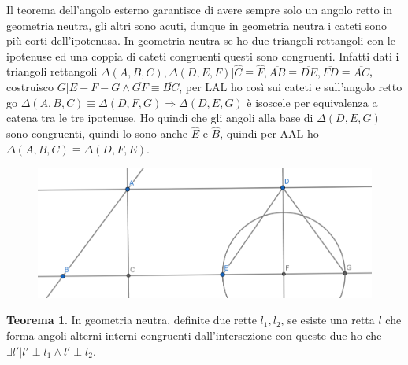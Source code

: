 \documentclass[a4paper,10pt]{article}
\theoremstyle{definition}
\theoremstyle{indentdefinition}
\theoremstyle{indentpostulate}
\theoremstyle{indenttheorem}
\newtheorem{thm}{Teorema}[section]
\theoremstyle{myremark}
\theoremstyle{indentgeneral}
\newenvironment{myboxed} 
{\noindent\begin{lrbox}{\mybox}\begin{minipage}{\textwidth}}
{\end{minipage}\end{lrbox}\fbox{\usebox{\mybox}}}
\begin{document}
Il teorema dell'angolo esterno garantisce di avere sempre solo un angolo retto in geometria neutra, gli altri sono acuti, dunque in geometria  neutra i cateti sono più corti dell'ipotenusa. In geometria neutra se ho due triangoli rettangoli con le ipotenuse ed una coppia di cateti congruenti questi sono congruenti. Infatti dati i triangoli rettangoli $\Delta (A,B,C), \Delta (D,E,F)| \hat{C} \equiv \hat{F}, \overline{AB} \equiv \overline{DE}, \overline{FD} \equiv \overline{AC}$, costruisco $G| E-F-G \land \overline{GF} \equiv \overline{BC}$, per LAL ho così sui cateti e sull'angolo retto go $\Delta (A,B,C) \equiv \Delta (D,F,G) \Rightarrow \Delta (D,E,G)$ è isoscele per equivalenza a catena tra le tre ipotenuse. Ho quindi che gli angoli alla base di $\Delta (D,E,G)$ sono congruenti, quindi lo sono anche $\hat{E}$ e $\hat{B}$, quindi per AAL ho $\Delta (A,B,C) \equiv \Delta (D,F,E)$.

\begin{figure}[H]
    \centering
    \includegraphics[scale=0.5]{Triangoli3.png}
\end{figure}

\vspace{.5cm}

\begin{myboxed}
\begin{thm}
    In geometria neutra, definite due rette $l_1,l_2$, se esiste una retta $l$ che forma angoli alterni interni congruenti dall'intersezione con queste due ho che $\exists l'| l' \perp l_1 \land l' \perp l_2$.
\end{thm}
\end{myboxed}
\end{document}
